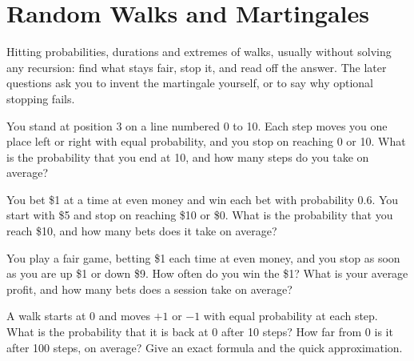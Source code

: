\chapter{Random Walks and Martingales}\label{ch:iv1:random-walks-and-martingales}

\begin{ivtrains}
Hitting probabilities, durations and extremes of walks, usually without solving any recursion: find what stays fair, stop it, and read off the answer. The later questions ask you to invent the martingale yourself, or to say why optional stopping fails.
\end{ivtrains}

\begin{question}\label{iq:iv1:random-walks-and-martingales:1}
You stand at position 3 on a line numbered 0 to 10. Each step moves you one place left or right with equal probability, and you stop on reaching 0 or 10. What is the probability that you end at 10, and how many steps do you take on average?
\end{question}

\begin{question}\label{iq:iv1:random-walks-and-martingales:2}
You bet \$1 at a time at even money and win each bet with probability $0.6$. You start with \$5 and stop on reaching \$10 or \$0. What is the probability that you reach \$10, and how many bets does it take on average?
\end{question}

\begin{question}\label{iq:iv1:random-walks-and-martingales:3}
You play a fair game, betting \$1 each time at even money, and you stop as soon as you are up \$1 or down \$9. How often do you win the \$1? What is your average profit, and how many bets does a session take on average?
\end{question}

\begin{question}\label{iq:iv1:random-walks-and-martingales:4}
A walk starts at 0 and moves $+1$ or $-1$ with equal probability at each step. What is the probability that it is back at 0 after 10 steps? How far from 0 is it after 100 steps, on average? Give an exact formula and the quick approximation.
\end{question}

